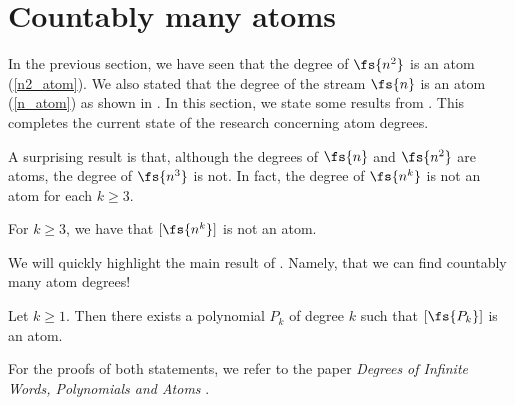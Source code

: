 \section{Countably many atoms}
In the previous section, we have seen that the degree of $\fs{n^2}$ is an atom (\cref{n2_atom}). We also stated that the degree of the stream $\fs{n}$ is an atom (\cref{n_atom}) as shown in \cite{streams:degrees:2011}. In this section, we state some results from \cite{streams:degrees:polynomials:2016}. This completes the current state of the research concerning atom degrees.

\vspace{1em}

A surprising result is that, although the degrees of $\fs{n}$ and $\fs{n^2}$ are atoms, the degree of $\fs{n^3}$ is not. In fact, the degree of $\fs{n^k}$ is not an atom for each $k\geq 3$.

\begin{theorem}
	For $k\geq 3$, we have that $[\fs{n^k}]$ is not an atom.
\end{theorem}

We will quickly highlight the main result of \cite{streams:degrees:polynomials:2016}. Namely, that we can find countably many atom degrees!

\begin{theorem}
	Let $k\geq 1$. Then there exists a polynomial $P_k$ of degree $k$ such that $[\fs{P_k}]$ is an atom.
\end{theorem}

For the proofs of both statements, we refer to the paper \textit{Degrees of Infinite Words, Polynomials and Atoms} \cite{streams:degrees:polynomials:2016}.
